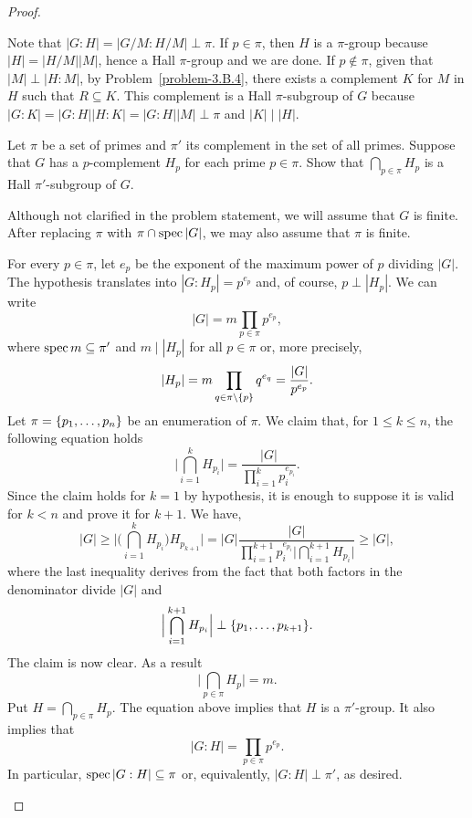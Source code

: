 \begin{proof}
\begin{solution}
Note that $|G:H|=|G/M:H/M|\perp\pi$. If $p\in\pi$, then $H$ is a $\pi$-group because $|H|=|H/M||M|$, hence a Hall $\pi$-group and we are done. If $p\notin\pi$, given that $|M|\perp|H:M|$, by Problem~\ref{problem-3.B.4}, there exists a complement $K$ for $M$ in $H$ such that $R\subseteq K$. This complement is a Hall $\pi$-subgroup of $G$ because $|G:K|=|G:H||H:K|=|G:H||M|\perp\pi$ and $|K|\mid|H|$.  \end{solution}

\begin{probl}
    Let\/ $\pi$ be a set of primes and\/ $\pi'$ its complement in the set of all primes. Suppose that\/ $G$ has a\/ $p$-complement\/ $H_p$ for each prime\/ $p \in\pi$. Show that\/ $\bigcap_{p\in\pi}H_p$
    is a Hall\/ $\pi'$-subgroup of\/ $G$.
\end{probl}

\begin{solution} Although not clarified in the problem statement, we will assume that $G$ is finite. After replacing $\pi$ with $\pi\cap\operatorname{spec}|G|$, we may also assume that $\pi$ is finite.

For every $p\in\pi$, let $e_p$ be the exponent of the maximum power of $p$ dividing $|G|$. The hypothesis translates into $|G:H_p|=p^{e_p}$ and, of course, $p\perp|H_p|$. We can write
$$
    |G|=m\prod_{p\in\pi}p^{e_p},
$$
where $\operatorname{spec}m\subseteq\pi'$ and $m\mid|H_p|$ for all $p\in\pi$ or, more precisely,
$$
    |H_p| = m\prod_{q\in\pi\setminus\{p\}}q^{e_q}=\frac{|G|}{p^{e_p}}.
$$
Let $\pi=\{p_1,\dots,p_n\}$ be an enumeration of $\pi$. We claim that, for $1\le k\le n$, the following equation holds
$$
    \Big|\bigcap_{i=1}^k H_{p_i}\Big| = \frac{|G|}{\prod_{i=1}^kp_i^{e_{p_i}}}.
$$
Since the claim holds for\/ $k=1$ by hypothesis, it is enough to suppose it is valid for\/ $k<n$ and prove it for\/ $k+1$. We have,
\begin{equation}\label{eq16}
    |G|\ge \Big|\Big(\bigcap_{i=1}^kH_{p_i}\Big)H_{p_{k+1}}\Big|
        = |G|\frac{|G|}{\prod_{i=1}^{k+1}p_i^{e_{p_i}}\Big|\bigcap_{i=1}^{k+1}H_{p_i}\Big|}
        \ge |G|,
\end{equation}
where the last inequality derives from the fact that both factors in the denominator divide $|G|$ and
$$
    \Big|\bigcap_{i=1}^{k+1}H_{p_i}\Big| \perp\{p_1,\dots,p_{k+1}\}.
$$
The claim is now clear. As a result
$$
    \Big|\bigcap_{p\in\pi}H_p\Big| = m.    
$$
Put $H=\bigcap_{p\in\pi}H_p$. The equation above implies that $H$ is a $\pi'$-group. It also implies that
\begin{equation}\label{eq17}
    |G:H|=\prod_{p\in\pi}p^{e_p}.
\end{equation}
In particular, $\operatorname{spec}|G:H|\subseteq\pi$ or, equivalently, $|G:H|\perp\pi'$, as desired.  \end{solution}


\end{proof}

